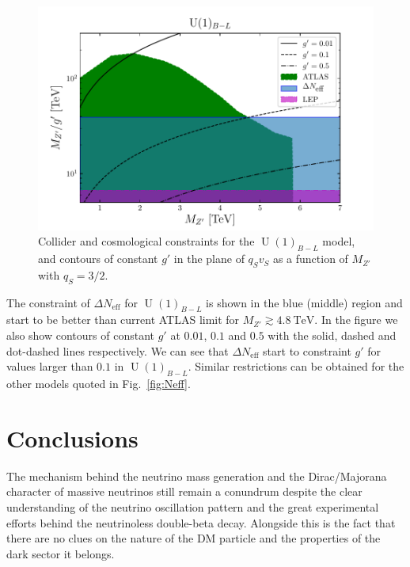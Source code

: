 \documentclass[12pt]{article}
\begin{document}
\begin{figure}[t]
    \centering
    \includegraphics[scale=1.0]{u1blc}
    \caption{Collider and cosmological constraints for the $\operatorname{U}(1)_{B-L}$ model, and contours of constant $g'$ in the plane of $q_S v_S$ as a function of $M_{Z'}$ with $q_S=3/2$.}
    \label{fig:u1blc}
\end{figure}

The constraint of $\Delta N_{\text{eff}}$ for $\operatorname{U}(1)_{B-L}$ is shown in the blue (middle) region and start to be better than current ATLAS limit for $M_{Z'}\gtrsim 4.8\ \text{TeV}$. In the figure we also show contours of constant $g'$ at $0.01$, $0.1$ and $0.5$ with the solid, dashed and dot-dashed lines respectively. We can see that $\Delta N_{\text{eff}}$ start to constraint $g'$ for values larger than $0.1$ in $\operatorname{U}(1)_{B-L}$.    Similar restrictions can be obtained for the other models quoted in Fig.~\ref{fig:Neff}.


\section{Conclusions}
The mechanism behind the neutrino mass generation and the Dirac/Majorana character of massive neutrinos still remain a conundrum despite the clear understanding of the neutrino oscillation pattern and the great experimental efforts behind the neutrinoless double-beta decay. Alongside this is the fact that there are no clues on the nature of the DM particle and the properties of the dark sector it belongs. 
\end{document}
